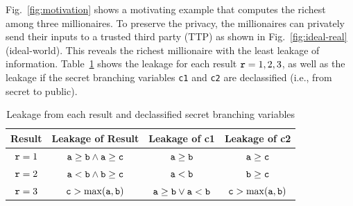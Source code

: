 %
%

Fig.~\ref{fig:motivation} shows a motivating example that computes the richest among three millionaires. %
To preserve the privacy, the millionaires can privately send their inputs to a trusted third party (TTP)
as shown in Fig.~\ref{fig:ideal-real} (ideal-world). This reveals
the richest millionaire with the least leakage of information.
Table~\ref{tab:max3table} shows the leakage  for each result ${\tt r}=1, 2, 3$, as well as the leakage if the secret branching variables {\tt c1} and {\tt c2} are declassified (i.e., from secret to public).

\begin{table}[ht]\vspace{-7mm}
\setlength{\tabcolsep}{4mm}
\centering
\caption{Leakage from each result and declassified secret branching variables}
\label{tab:max3table}
\begin{tabular}{c|c|c|c}
\hline
\textbf{Result}  &  \textbf{Leakage of Result} &\textbf{Leakage of c1} & \textbf{Leakage of  c2} \\ \hline
${\tt r} = 1$   &${\tt a}\geq{\tt b} \wedge {\tt a}\geq{\tt c}$ & ${\tt a}\geq {\tt b}$ & ${\tt a}\geq{\tt c}$    \\ \hline
${\tt r}= 2$    & ${\tt a}<{\tt b} \wedge {\tt b}\geq {\tt c}$ &${\tt a}<{\tt b}$  & ${\tt b}\geq {\tt c}$     \\ \hline
${\tt r}= 3$    &  ${\tt c}>\max({\tt a},{\tt b})$  & ${\tt a}\geq{\tt b}\vee{\tt a}<{\tt b}$ &  ${\tt c}>\max({\tt a},{\tt b})$            \\
\hline
\end{tabular}
\vspace{-4mm}
\end{table}


